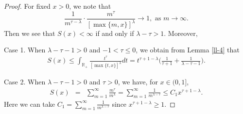 \documentclass[10pt]{amsart}
\theoremstyle{definition}    %
\numberwithin{equation}{section}
\begin{document}
\begin{proof}
For fixed $x>0$, we note that 
$$\frac{1}{m^{\tau-\lambda}}\cdot\frac{m^{\tau}}{[\max\{m,x\}]^{\lambda}}\rightarrow 1,\,\, {\text{as}}\,\, m\rightarrow \infty.$$ 
Then we see that $S(x)<\infty$ if and only if $\lambda-\tau>1$. Moreover, 

Case 1. When $\lambda-\tau-1>0$ and $-1<\tau\leq 0$, we obtain from Lemma \ref{ll-4} that 
\begin{eqnarray}
S(x)\leq \int_{\mathbb{R}_{+}}\frac{t^{\tau}}{[\max\{{t,x}\}]^{\lambda}}dt=t^{\tau+1-\lambda}\Big(\frac{1}{\tau+1}+\frac{1}{\lambda-\tau-1}\Big). \nonumber
\end{eqnarray}

Case 2. When $\lambda-\tau-1>0$ and $\tau>0$, we have, for $x\in (0,1]$, 
\begin{eqnarray}\label{s-1}
S(x)&=&\sum_{m=1}^{\infty}\frac{m^{\tau}}{m^{\lambda}}=\sum_{m=1}^{\infty}\frac{1}{m^{\lambda-\tau}}\leq C_1 x^{\tau+1-\lambda}.\nonumber
\end{eqnarray}
Here we can take $C_1=\sum_{m=1}^{\infty}\frac{1}{m^{\lambda-\tau}}$ since $x^{\tau+1-\lambda}\geq 1$. 


\end{proof}
\end{document}
